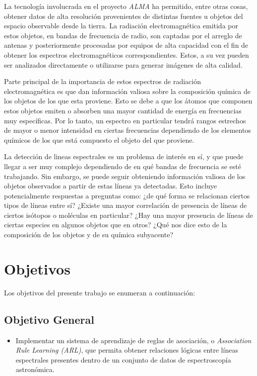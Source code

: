 \begin{intro}
La tecnología involucrada en el proyecto \textit{ALMA} ha permitido, entre otras cosas, obtener datos de alta resolución provenientes de distintas fuentes u objetos del espacio observable desde la tierra. La radiación electromagnética emitida por estos objetos, en bandas de frecuencia de radio, son captadas por el arreglo de antenas y posteriormente procesadas por equipos de alta capacidad con el fin de obtener los espectros electromagnéticos correspondientes. Estos, a su vez pueden ser analizados directamente o utilizarse para generar imágenes de alta calidad.

Parte principal de la importancia de estos espectros de radiación electromagnética es que dan información valiosa sobre la composición química de los objetos de los que esta proviene. Esto se debe a que los átomos que componen estos objetos emiten o absorben una mayor cantidad de energía en frecuencias muy específicas. Por lo tanto, un espectro en particular tendrá rangos estrechos de mayor o menor intensidad en ciertas frecuencias dependiendo de los elementos químicos de los que está compuesto el objeto del que proviene.

La detección de lineas espectrales es un problema de interés en sí, y que puede llegar a ser muy complejo dependiendo de en qué bandas de frecuencia se esté trabajando. Sin embargo, se puede seguir obteniendo información valiosa de los objetos observados a partir de estas líneas ya detectadas. Esto incluye potencialmente respuestas a preguntas como: ¿de qué forma se relacionan ciertos tipos de líneas entre sí? ¿Existe una mayor correlación de presencia de líneas de ciertos isótopos o moléculas en particular? ¿Hay una mayor presencia de líneas de ciertas especies en algunos objetos que en otros? ¿Qué nos dice esto de la composición de los objetos y de su química subyacente?

\section*{Objetivos}

Los objetivos del presente trabajo se enumeran a continuación:

\subsection*{Objetivo General}

\begin{itemize}
	\item Implementar un sistema de aprendizaje de reglas de asociación, o \textit{Association Rule Learning (ARL)}, que permita obtener relaciones lógicas entre líneas espectrales presentes dentro de un conjunto de datos de espectroscopía astronómica.
\end{itemize}


\end{intro}
